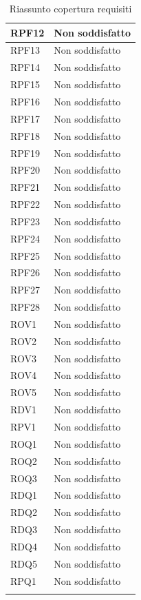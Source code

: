 \begin{longtable}{| p{2.5cm} | p{3cm} |}
	RPF12 & Non soddisfatto \\ \hline
	RPF13 & Non soddisfatto \\ \hline
	RPF14 & Non soddisfatto \\ \hline
	RPF15 & Non soddisfatto \\ \hline
	RPF16 & Non soddisfatto \\ \hline
	RPF17 & Non soddisfatto \\ \hline
	RPF18 & Non soddisfatto \\ \hline
	RPF19 & Non soddisfatto \\ \hline
	RPF20 & Non soddisfatto \\ \hline
	RPF21 & Non soddisfatto \\ \hline
	RPF22 & Non soddisfatto \\ \hline
	RPF23 & Non soddisfatto \\ \hline
	RPF24 & Non soddisfatto \\ \hline
	RPF25 & Non soddisfatto \\ \hline
	RPF26 & Non soddisfatto \\ \hline
	RPF27 & Non soddisfatto \\ \hline
	RPF28 & Non soddisfatto \\ \hline
	ROV1 & Non soddisfatto \\ \hline
	ROV2 & Non soddisfatto \\ \hline
	ROV3 & Non soddisfatto \\ \hline
	ROV4 & Non soddisfatto \\ \hline
	ROV5 & Non soddisfatto \\ \hline
	RDV1 & Non soddisfatto \\ \hline
	RPV1 & Non soddisfatto \\ \hline
	ROQ1 & Non soddisfatto \\ \hline
	ROQ2 & Non soddisfatto \\ \hline
	ROQ3 & Non soddisfatto \\ \hline
	RDQ1 & Non soddisfatto \\ \hline
	RDQ2 & Non soddisfatto \\ \hline
	RDQ3 & Non soddisfatto \\ \hline
	RDQ4 & Non soddisfatto \\ \hline
	RDQ5 & Non soddisfatto \\ \hline
	RPQ1 & Non soddisfatto \\ \hline
	\caption{Riassunto copertura requisiti}
\end{longtable}

\newpage
